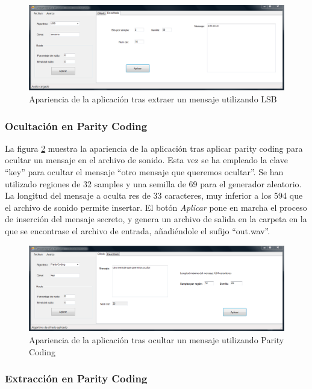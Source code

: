 \documentclass[12pt]{article}
\begin{document}
\begin{figure}[h]
  \centering
    \includegraphics[width=\textwidth]{img/ss3}
  \caption{Apariencia de la aplicación tras extraer un mensaje utilizando LSB}
  \label{ss3}
\end{figure}

\subsubsection{Ocultación en Parity Coding}

La figura \ref{ss4} muestra la apariencia de la aplicación tras aplicar parity coding para ocultar un mensaje en el archivo de sonido. Esta vez se ha empleado la clave ``key'' para ocultar el mensaje ``otro mensaje que queremos ocultar''. Se han utilizado regiones de 32 samples y una semilla de 69 para el generador aleatorio. La longitud del mensaje a oculta res de 33 caracteres, muy inferior a los 594 que el archivo de sonido permite insertar. El botón \emph{Aplicar} pone en marcha el proceso de inserción del mensaje secreto, y genera un archivo de salida en la carpeta en la que se encontrase el archivo de entrada, añadiéndole el sufijo ``out.wav''.

\begin{figure}[h]
  \centering
    \includegraphics[width=\textwidth]{img/ss4}
  \caption{Apariencia de la aplicación tras ocultar un mensaje utilizando Parity Coding}
  \label{ss4}
\end{figure}

\subsubsection{Extracción en Parity Coding}
\end{document}
